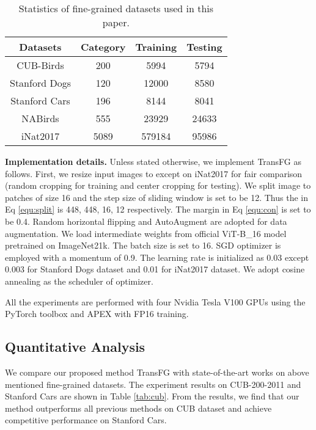 \documentclass[10pt,twocolumn,letterpaper]{article}
\begin{document}
\begin{table}[!h]
    \small
    \centering
    \caption{Statistics of fine-grained datasets used in this paper.}
    \label{tab:stat}
    \begin{tabular}{|c|c|c|c|}
    \hline
    Datasets & Category & Training & Testing \\ \hline
    CUB-Birds & 200 & 5994 & 5794 \\ \hline
    Stanford Dogs & 120 & 12000 & 8580 \\ \hline
    Stanford Cars & 196 & 8144 & 8041 \\ \hline
    NABirds & 555 & 23929 & 24633 \\ \hline
    iNat2017 & 5089 & 579184 & 95986 \\ \hline
    \end{tabular}
\end{table}

\textbf{Implementation details.}
Unless stated otherwise, we implement TransFG as follows. First, we resize input images to  except  on iNat2017 for fair comparison (random cropping for training and center cropping for testing). We split image to patches of size 16 and the step size of sliding window is set to be 12. Thus the  in Eq \ref{equ:split} is 448, 448, 16, 12 respectively. The margin  in Eq \ref{equ:con} is set to be 0.4. Random horizontal flipping and AutoAugment \cite{cubuk2019autoaugment} are adopted for data augmentation. We load intermediate weights from official ViT-B\_16 model pretrained on ImageNet21k. The batch size is set to 16. SGD optimizer is employed with a momentum of 0.9. The learning rate is initialized as 0.03 except 0.003 for Stanford Dogs dataset and 0.01 for iNat2017 dataset. We adopt cosine annealing as the scheduler of optimizer.

All the experiments are performed with four Nvidia Tesla V100 GPUs using the PyTorch toolbox and APEX with FP16 training.

\subsection{Quantitative Analysis}
\label{sec:quan}

We compare our proposed method TransFG with state-of-the-art works on above mentioned fine-grained datasets. The experiment results on CUB-200-2011 and Stanford Cars are shown in Table \ref{tab:cub}. From the results, we find that our method outperforms all previous methods on CUB dataset and achieve competitive performance on Stanford Cars.
\end{document}
